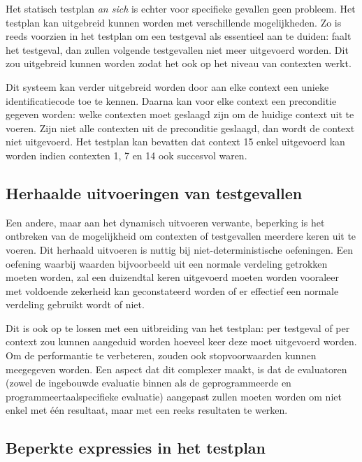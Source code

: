 Het statisch testplan \emph{an sich} is echter voor specifieke gevallen geen probleem.
Het testplan kan uitgebreid kunnen worden met verschillende mogelijkheden.
Zo is reeds voorzien in het testplan om een testgeval als essentieel aan te duiden: faalt het testgeval, dan zullen volgende testgevallen niet meer uitgevoerd worden.
Dit zou uitgebreid kunnen worden zodat het ook op het niveau van contexten werkt.

Dit systeem kan verder uitgebreid worden door aan elke context een unieke identificatiecode toe te kennen.
Daarna kan voor elke context een preconditie gegeven worden: welke contexten moet geslaagd zijn om de huidige context uit te voeren.
Zijn niet alle contexten uit de preconditie geslaagd, dan wordt de context niet uitgevoerd.
Het testplan kan bevatten dat context 15 enkel uitgevoerd kan worden indien contexten 1, 7 en 14 ook succesvol waren.

\subsection{Herhaalde uitvoeringen van testgevallen}\label{subsec:herhaalde-uitvoeringen-van-testgevallen}

Een andere, maar aan het dynamisch uitvoeren verwante, beperking is het ontbreken van de mogelijkheid om contexten of testgevallen meerdere keren uit te voeren.
Dit herhaald uitvoeren is nuttig bij niet-deterministische oefeningen.
Een oefening waarbij waarden bijvoorbeeld uit een normale verdeling getrokken moeten worden, zal een duizendtal keren uitgevoerd moeten worden vooraleer met voldoende zekerheid kan geconstateerd worden of er effectief een normale verdeling gebruikt wordt of niet.

Dit is ook op te lossen met een uitbreiding van het testplan: per testgeval of per context zou kunnen aangeduid worden hoeveel keer deze moet uitgevoerd worden.
Om de performantie te verbeteren, zouden ook stopvoorwaarden kunnen meegegeven worden.
Een aspect dat dit complexer maakt, is dat de evaluatoren (zowel de ingebouwde evaluatie binnen \tested{} als de geprogrammeerde en programmeertaalspecifieke evaluatie) aangepast zullen moeten worden om niet enkel met één resultaat, maar met een reeks resultaten te werken.

\subsection{Beperkte expressies in het testplan}\label{subsec:beperkte-expressies-in-het-testplan}

